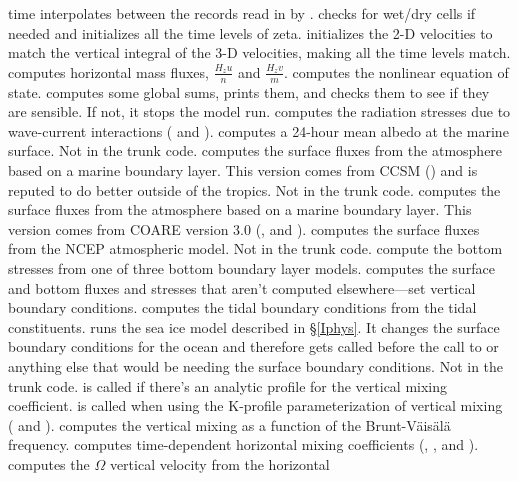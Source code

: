 \begin{klist}
   time interpolates between the records read in by
  .
   checks for wet/dry cells if needed and initializes
  all the time levels of zeta.
   initializes the 2-D velocities to match the
  vertical integral of the 3-D velocities, making all the time levels
  match.
   computes horizontal mass fluxes, $\frac{H_z
  u}{n}$ and $\frac{H_z v}{m}$.
   computes the nonlinear equation of state.
   computes some global sums, prints them, and checks them to
  see if they are sensible. If not, it stops the model run.
   computes the radiation stresses due to
  wave-current interactions (\cite{Mellor_2003} and \cite{Mellor_2005}).
   computes a 24-hour mean albedo at the marine
  surface. Not in the trunk code.
   computes the surface fluxes from the atmosphere
  based on a marine boundary layer. This version comes from CCSM
  (\cite{Large_08}) and is
  reputed to do better outside of the tropics. Not in the trunk code.
   computes the surface fluxes from the atmosphere
  based on a marine boundary layer. This version comes from COARE
  version 3.0 (\cite{Fairall_2003}, \cite{Taylor_2001} and
  \cite{Oost_2002}).
   computes the surface fluxes from the NCEP
  atmospheric model. Not in the trunk code.
   compute the bottom stresses from one of three bottom
  boundary layer models.
   computes the surface and bottom fluxes and stresses
  that aren't computed elsewhere---set vertical boundary conditions.
   computes the tidal boundary conditions from the
  tidal constituents.
   runs the sea ice model described in \S\ref{Iphys}. It
  changes the surface boundary conditions for the ocean and therefore
  gets called before the call to  or anything else that
  would be needing the surface boundary conditions. Not in the trunk
  code.
   is called if there's an analytic profile for the
  vertical mixing coefficient.
   is called when using the K-profile parameterization
  of vertical mixing (\cite{Large94} and \cite{Large98}).
   computes the vertical mixing as a function of the
  Brunt-V\"ais\"al\"a frequency.
   computes time-dependent horizontal mixing coefficients
  (\cite{S63}, \cite{Holland_98}, \cite{Webb_98} and \cite{Griffies_2000}).
   computes the $\Omega$ vertical velocity from the horizontal

\end{klist}
